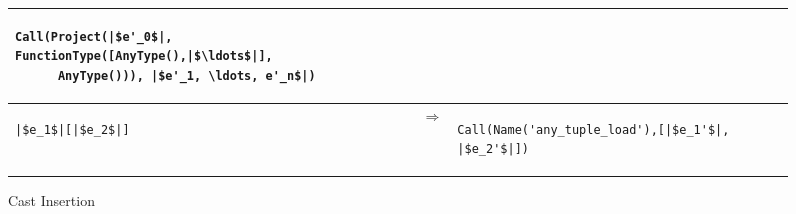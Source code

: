 \documentclass[7x10,nocrop]{TimesAPriori_MIT}%
\begin{document}
\begin{figure}[btp]
{\begin{tabular}{|lll|}
\begin{minipage}{0.7\textwidth}
\begin{lstlisting}
Call(Project(|$e'_0$|, FunctionType([AnyType(),|$\ldots$|],
      AnyType())), |$e'_1, \ldots, e'_n$|)
\end{lstlisting}
\end{minipage}
\\[2ex]\hline
\begin{minipage}{0.22\textwidth}
\begin{lstlisting}
|$e_1$|[|$e_2$|]
\end{lstlisting}
\end{minipage}
&
$\Rightarrow$
&
\begin{minipage}{0.7\textwidth}
\begin{lstlisting}
Call(Name('any_tuple_load'),[|$e_1'$|, |$e_2'$|])
\end{lstlisting}
\end{minipage}
\\[2ex]\hline
\end{tabular} 
\fi}
\caption{Cast Insertion}
\label{fig:compile-r7-Rany}
\end{figure}
\end{document}

